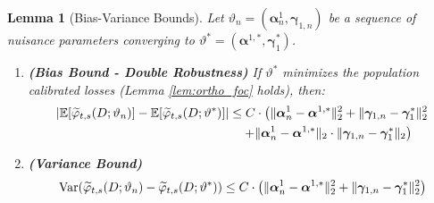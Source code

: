 \documentclass{article}
\newtheorem{lemma}[theorem]{Lemma}
\begin{document}
\begin{lemma}[Bias-Variance Bounds]\label{lem:bias_bound}
Let $\vartheta_n = (\boldsymbol{\alpha}_n^1, \boldsymbol{\gamma}_{1,n})$ be a sequence of nuisance parameters converging to $\vartheta^*=(\boldsymbol{\alpha}^{1,*},\boldsymbol{\gamma}_1^*)$.
\begin{enumerate}
    \item \textbf{(Bias Bound - Double Robustness)} If $\vartheta^*$ minimizes the population calibrated losses (Lemma \ref{lem:ortho_foc} holds), then:
    \[
    \begin{aligned}
    \lvert \operatorname{\mathbb{E}}[\widetilde{\varphi}_{t,s}(D; \vartheta_n)] - \operatorname{\mathbb{E}}[\widetilde{\varphi}_{t,s}(D; \vartheta^*)] \rvert
    &\le C \cdot \left(
        \lVert \boldsymbol{\alpha}_n^1 - \boldsymbol{\alpha}^{1,*} \rVert_2^2
        +
        \lVert \boldsymbol{\gamma}_{1,n} - \boldsymbol{\gamma}_1^* \rVert_2^2 \right. \\
    &\quad\left. +
        \lVert \boldsymbol{\alpha}_n^1 - \boldsymbol{\alpha}^{1,*} \rVert_2 \cdot \lVert \boldsymbol{\gamma}_{1,n} - \boldsymbol{\gamma}_1^* \rVert_2
    \right)
    \end{aligned}
    \]
    \item \textbf{(Variance Bound)}
    \[
    \operatorname{Var}(\widetilde{\varphi}_{t,s}(D; \vartheta_n) - \widetilde{\varphi}_{t,s}(D; \vartheta^*))
    \le C \cdot \left( \lVert \boldsymbol{\alpha}_n^1 - \boldsymbol{\alpha}^{1,*} \rVert_2^2 + \lVert \boldsymbol{\gamma}_{1,n} - \boldsymbol{\gamma}_1^* \rVert_2^2 \right)
    \]
\end{enumerate}
\end{lemma}
\end{document}
